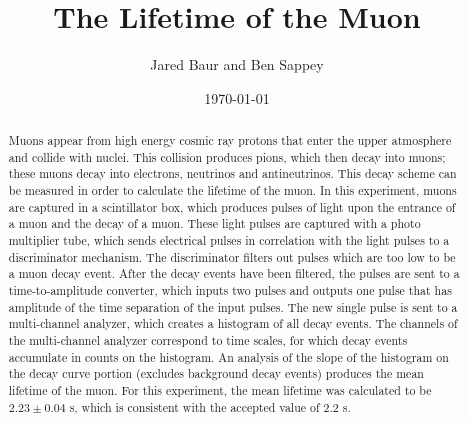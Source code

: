 \documentclass[%
 aip,
 amsmath,amssymb,
 reprint,%
floatfix,
]{revtex4-1}
\begin{document}

\title[]{The Lifetime of the Muon}

\author{Jared Baur and Ben Sappey}

\date{\today}%


\begin{abstract}

	Muons appear from high energy cosmic ray protons that enter the upper atmosphere and collide with nuclei. This collision produces pions, which then decay into muons; these muons decay into electrons, neutrinos and antineutrinos. This decay scheme can be measured in order to calculate the lifetime of the muon. In this experiment, muons are captured in a scintillator box, which produces pulses of light upon the entrance of a muon and the decay of a muon. These light pulses are captured with a photo multiplier tube, which sends electrical pulses in correlation with the light pulses to a discriminator mechanism. The discriminator filters out pulses which are too low to be a muon decay event. After the decay events have been filtered, the pulses are sent to a time-to-amplitude converter, which inputs two pulses and outputs one pulse that has amplitude of the time separation of the input pulses. The new single pulse is sent to a multi-channel analyzer, which creates a histogram of all decay events. The channels of the multi-channel analyzer correspond to time scales, for which decay events accumulate in counts on the histogram. An analysis of the slope of the histogram on the decay curve portion (excludes background decay events) produces the mean lifetime of the muon. For this experiment, the mean lifetime was calculated to be $2.23 \pm 0.04$ \textmu s, which is consistent with the accepted value of 2.2 \textmu s.

\end{abstract}

\maketitle
\end{document}
